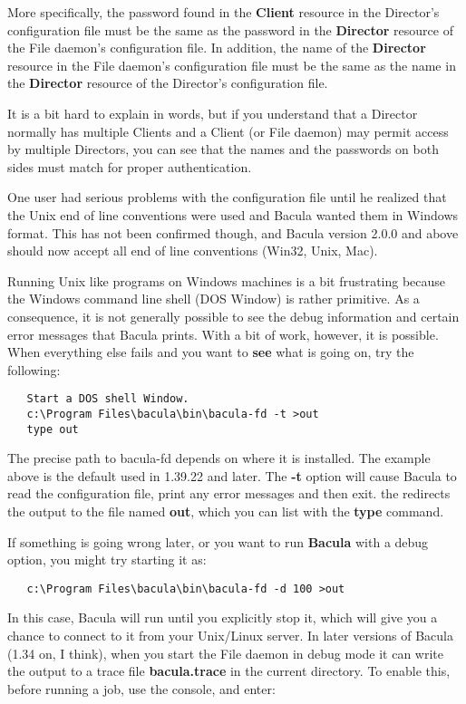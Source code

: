 More specifically, the password found in the {\bf Client} resource in the
Director's configuration file must be the same as the password in the {\bf
Director} resource of the File daemon's configuration file. In addition, the
name of the {\bf Director} resource in the File daemon's configuration file
must be the same as the name in the {\bf Director} resource of the Director's
configuration file. 

It is a bit hard to explain in words, but if you understand that a Director
normally has multiple Clients and a Client (or File daemon) may permit access
by multiple Directors, you can see that the names and the passwords on both
sides must match for proper authentication. 

One user had serious problems with the configuration file until he realized
that the Unix end of line conventions were used and Bacula wanted them in
Windows format. This has not been confirmed though, and Bacula version 2.0.0 
and above should now accept all end of line conventions (Win32,
Unix, Mac).

Running Unix like programs on Windows machines is a bit frustrating because
the Windows command line shell (DOS Window) is rather primitive. As a
consequence, it is not generally possible to see the debug information and
certain error messages that Bacula prints. With a bit of work, however, it is
possible. When everything else fails and you want to {\bf see} what is going
on, try the following: 

\footnotesize
\begin{verbatim}
   Start a DOS shell Window.
   c:\Program Files\bacula\bin\bacula-fd -t >out
   type out
\end{verbatim}
\normalsize

The precise path to bacula-fd depends on where it is installed. The
example above is the default used in 1.39.22 and later.
The {\bf -t} option will cause Bacula to read the configuration file, print
any error messages and then exit. the {\bf \gt{}} redirects the output to the
file named {\bf out}, which you can list with the {\bf type} command. 

If something is going wrong later, or you want to run {\bf Bacula} with a
debug option, you might try starting it as: 

\footnotesize
\begin{verbatim}
   c:\Program Files\bacula\bin\bacula-fd -d 100 >out
\end{verbatim}
\normalsize

In this case, Bacula will run until you explicitly stop it, which will give
you a chance to connect to it from your Unix/Linux server. In later versions
of Bacula (1.34 on, I think), when you start the File daemon in debug mode it
can write the output to a trace file {\bf bacula.trace} in the current
directory. To enable this, before running a job, use the console, and enter: 

